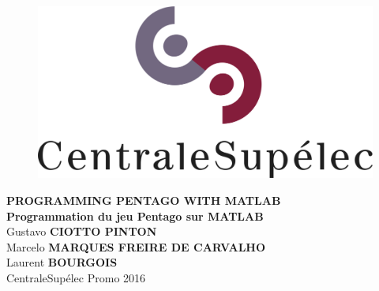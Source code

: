 \begin{titlepage}
\vspace*{.28\textheight}
\begin{center}
%
\begin{figure}[h]
    \centering
    \includegraphics[scale=0.50]{images/LogoSupelec}
\end{figure}
%
\vspace*{10pt}
\textbf{\LARGE PROGRAMMING PENTAGO WITH MATLAB} \\
\vspace*{10pt}
\textbf{\LARGE Programmation du jeu Pentago sur MATLAB}\\[2 cm]

Gustavo \textbf{CIOTTO PINTON} \\ 
Marcelo \textbf{MARQUES FREIRE DE CARVALHO}\\[1 cm] 

\vspace*{10pt}
Laurent \textbf{BOURGOIS} \\[1cm]

CentraleSupélec Promo 2016

\end{center}
\end{titlepage}

\newpage
